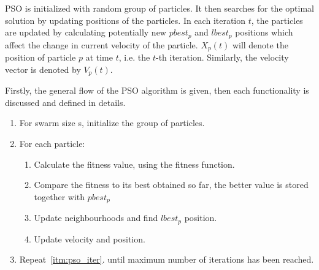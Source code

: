 \documentclass{book}
\begin{document}
PSO is initialized with random group of particles. It then searches for the optimal solution by updating positions of the particles.
In each iteration $t$, the particles are updated by calculating potentially new $pbest_p$ and $lbest_p$ positions which affect the change in current velocity of the particle. $X_p(t)$ will denote the position of particle $p$ at time $t$, i.e. the $t$-th iteration. Similarly, the velocity vector is denoted by $V_p(t)$.

Firstly, the general flow of the PSO algorithm is given, then each functionality is discussed and defined in details.

\begin{center}
    
    \begin{enumerate}
        \item For swarm size s, initialize the group of particles.
        
        \item For each particle: \label{itm:pso_iter}
        \begin{enumerate}
            \item Calculate the fitness value, using the fitness function.
            \item Compare the fitness to its best obtained so far, the better value is stored together with $pbest_p$	
            
            \item Update neighbourhoods and find $lbest_p$ position.
            
            \item Update velocity and position.	
        \end{enumerate}
        
        \item Repeat~\ref{itm:pso_iter}. until maximum number of iterations has been reached.
        
    \end{enumerate}
    
\end{center}





\end{document}
